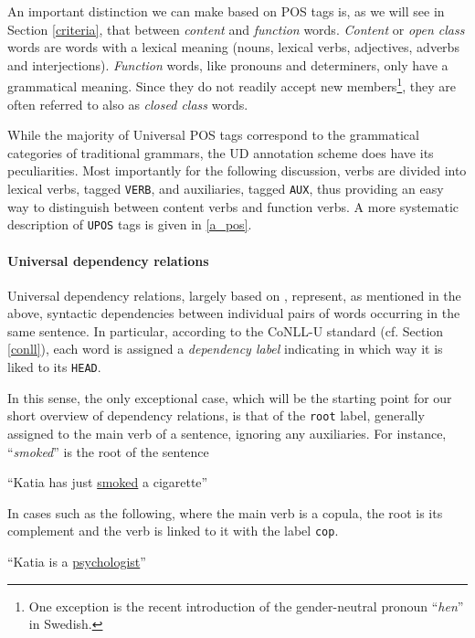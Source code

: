 An important distinction we can make based on POS tags is, as we will see in Section \ref{criteria}, that between \textit{content} and \textit{function} words.
\textit{Content} or \textit{open class} words are words with a lexical meaning (nouns, lexical verbs, adjectives, adverbs and interjections).
\textit{Function} words, like pronouns and determiners, only have a grammatical meaning. Since they do not readily accept new members\footnote{One exception is the recent introduction of the gender-neutral pronoun ``\textit{hen}'' in Swedish.}, they are often referred to also as \textit{closed class} words. \smallskip

While the majority of Universal POS tags correspond to the grammatical categories of traditional grammars, the UD annotation scheme does have its peculiarities. 
Most importantly for the following discussion, verbs are divided into lexical verbs, tagged \texttt{VERB}, and auxiliaries, tagged \texttt{AUX}, thus providing an easy way to distinguish between content verbs and function verbs. 
A more systematic description of \texttt{UPOS} tags is given in \ref{a_pos}.

\paragraph{Universal dependency relations}
Universal dependency relations, largely based on \cite{st2}, represent, as mentioned in the above, syntactic dependencies between individual pairs of words occurring in the same sentence. 
In particular, according to the CoNLL-U standard (cf. Section \ref{conll}), each word is assigned a \textit{dependency label} indicating in which way it is liked to its \texttt{HEAD}. \smallskip 

In this sense, the only exceptional case, which will be the starting point for our short overview of dependency relations, is that of the \texttt{root} label, generally assigned to the main verb of a sentence, ignoring any auxiliaries. 
For instance, ``\textit{smoked}'' is the root of the sentence \smallskip

\begin{example} \label{katia1}
    ``Katia has just \underline{smoked} a cigarette''
\end{example} \smallskip

In cases such as the following, where the main verb is a copula, the root is its complement and the verb is linked to it with the label \texttt{cop}. \smallskip

\begin{example} \label{katia2}
    ``Katia is a \underline{psychologist}''
\end{example} \smallskip

